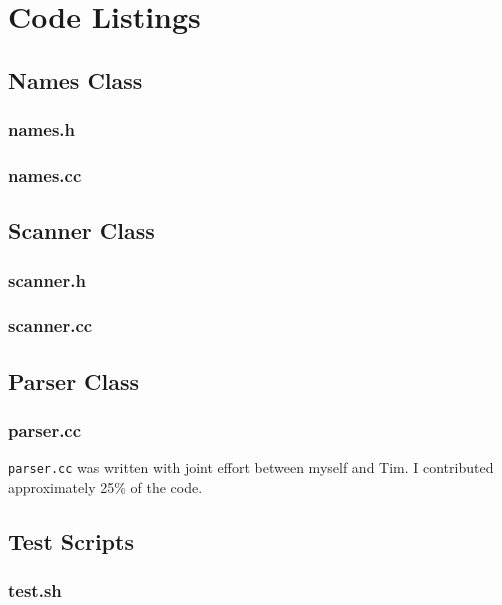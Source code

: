 \documentclass[a4paper,10pt]{article}
\begin{document}
\pagebreak

\appendix
\section{Code Listings}
\subsection{Names Class}
\subsubsection{names.h}

\subsubsection{names.cc}


\subsection{Scanner Class}
\subsubsection{scanner.h}

\subsubsection{scanner.cc}


\subsection{Parser Class}
\subsubsection{parser.cc}


\texttt{parser.cc} was written with joint effort between myself and Tim. I contributed approximately 25\% of the code.

\subsection{Test Scripts}
\label{sec:tests}
\subsubsection{test.sh}

\end{document}
